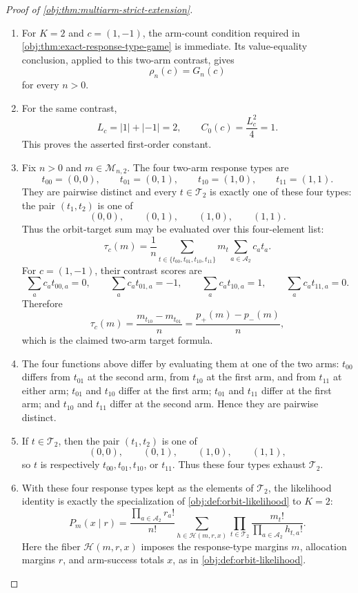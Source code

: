 \begin{proof}[Proof of \cref{obj:thm:multiarm-strict-extension}]
\begin{enumerate}
\item For \(K=2\) and \(c=(1,-1)\), the arm-count condition required in \cref{obj:thm:exact-response-type-game} is immediate. Its value-equality conclusion, applied to this two-arm contrast, gives
\[
\rho_n(c)=G_n(c)
\]
for every \(n>0\). %

\item For the same contrast,
\[
L_c=|1|+|-1|=2,
\qquad
C_0(c)=\frac{L_c^2}{4}=1 .
\]
This proves the asserted first-order constant. %

\item Fix \(n>0\) and \(m\in\mathcal M_{n,2}\). The four two-arm response types are
\[
t_{00}=(0,0),\qquad
t_{01}=(0,1),\qquad
t_{10}=(1,0),\qquad
t_{11}=(1,1).
\]
They are pairwise distinct and every \(t\in\mathcal T_2\) is exactly one of these four types: the pair \((t_1,t_2)\) is one of
\[
(0,0),\qquad (0,1),\qquad (1,0),\qquad (1,1).
\]
Thus the orbit-target sum may be evaluated over this four-element list:
\[
\tau_c(m)
=
\frac{1}{n}\sum_{t\in\{t_{00},t_{01},t_{10},t_{11}\}}m_t\sum_{a\in\mathcal A_2}c_a t_a .
\]
For \(c=(1,-1)\), their contrast scores are
\[
\sum_a c_a t_{00,a}=0,\qquad
\sum_a c_a t_{01,a}=-1,\qquad
\sum_a c_a t_{10,a}=1,\qquad
\sum_a c_a t_{11,a}=0 .
\]
Therefore
\[
\tau_c(m)
=
\frac{m_{t_{10}}-m_{t_{01}}}{n}
=
\frac{p_+(m)-p_-(m)}{n},
\]
which is the claimed two-arm target formula. %

\item The four functions above differ by evaluating them at one of the two arms: \(t_{00}\) differs from \(t_{01}\) at the second arm, from \(t_{10}\) at the first arm, and from \(t_{11}\) at either arm; \(t_{01}\) and \(t_{10}\) differ at the first arm; \(t_{01}\) and \(t_{11}\) differ at the first arm; and \(t_{10}\) and \(t_{11}\) differ at the second arm. Hence they are pairwise distinct. %

\item If \(t\in\mathcal T_2\), then the pair \((t_1,t_2)\) is one of
\[
(0,0),\qquad (0,1),\qquad (1,0),\qquad (1,1),
\]
so \(t\) is respectively \(t_{00},t_{01},t_{10}\), or \(t_{11}\). Thus these four types exhaust \(\mathcal T_2\). %

\item With these four response types kept as the elements of \(\mathcal T_2\), the likelihood identity is exactly the specialization of \cref{obj:def:orbit-likelihood} to \(K=2\):
\[
P_m(x\mid r)
=
\frac{\prod_{a\in\mathcal A_2} r_a!}{n!}
\sum_{h\in\mathcal H(m,r,x)}
\prod_{t\in\mathcal T_2}
\frac{m_t!}{\prod_{a\in\mathcal A_2} h_{t,a}!}.
\]
Here the fiber \(\mathcal H(m,r,x)\) imposes the response-type margins \(m\), allocation margins \(r\), and arm-success totals \(x\), as in \cref{obj:def:orbit-likelihood}. %


\end{enumerate}
\end{proof}
